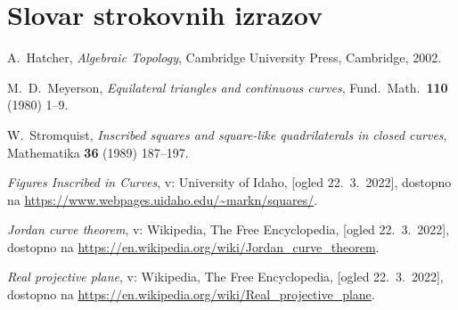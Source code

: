 \documentclass[mat1]{fmfdelo}
\begin{document}
\section*{Slovar strokovnih izrazov}

\geslo{}{}
\geslo{}{}

\begin{thebibliography}{99}

A.~Hatcher, \emph{Algebraic Topology}, Cambridge University Press, Cambridge, 2002.

M.~D.~Meyerson, \emph{Equilateral triangles and continuous curves}, Fund.\ Math.\ \textbf{110} (1980) 1--9.

W.~Stromquist, \emph{Inscribed squares and square-like quadrilaterals in closed curves}, Mathematika \textbf{36} (1989) 187--197.

\emph{Figures Inscribed in Curves}, v: University of Idaho, [ogled 22.~3.~2022], dostopno na \url{https://www.webpages.uidaho.edu/~markn/squares/}.

\emph{Jordan curve theorem}, v: Wikipedia, The Free Encyclopedia, [ogled 22.~3.~2022], dostopno na \url{https://en.wikipedia.org/wiki/Jordan_curve_theorem}.

\emph{Real projective plane}, v: Wikipedia, The Free Encyclopedia, [ogled 22.~3.~2022], dostopno na \url{https://en.wikipedia.org/wiki/Real_projective_plane}.

\end{thebibliography}
\end{document}
